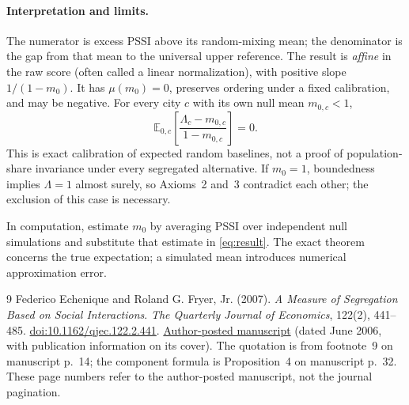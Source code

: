 \documentclass[11pt]{article}
\newcommand{\E}{\mathbb{E}}
\begin{document}
\paragraph{Interpretation and limits.}
The numerator is excess PSSI above its random-mixing mean; the denominator is
the gap from that mean to the universal upper reference. The result is
\emph{affine} in the raw score (often called a linear normalization), with
positive slope $1/(1-m_0)$. It has $\mu(m_0)=0$, preserves ordering under a
fixed calibration, and may be negative. For every city $c$ with its own null
mean $m_{0,c}<1$,
\[
 \E_{0,c}\!\left[\frac{\Lambda_c-m_{0,c}}{1-m_{0,c}}\right]=0.
\]
This is exact calibration of expected random baselines, not a proof of
population-share invariance under every segregated alternative. If $m_0=1$,
boundedness implies $\Lambda=1$ almost surely, so Axioms~2 and~3 contradict
each other; the exclusion of this case is necessary.

In computation, estimate $m_0$ by averaging PSSI over independent null
simulations and substitute that estimate in \eqref{eq:result}. The exact
theorem concerns the true expectation; a simulated mean introduces numerical
approximation error.

\begin{thebibliography}{9}
Federico Echenique and Roland G. Fryer, Jr. (2007).
\emph{A Measure of Segregation Based on Social Interactions}.
\emph{The Quarterly Journal of Economics}, 122(2), 441--485.
\href{https://doi.org/10.1162/qjec.122.2.441}{doi:10.1162/qjec.122.2.441}.
\href{https://eml.berkeley.edu/~fechenique/published/echenique-fryer-qje.pdf}{Author-posted manuscript}
(dated June 2006, with publication information on its cover).
The quotation is from footnote~9 on manuscript p.~14; the component formula
is Proposition~4 on manuscript p.~32. These page numbers refer to the
author-posted manuscript, not the journal pagination.
\end{thebibliography}
\end{document}
